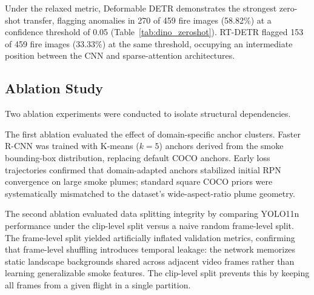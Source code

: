 \documentclass[conference]{IEEEtran}
\begin{document}

Under the relaxed metric, Deformable DETR demonstrates the strongest zero-shot transfer, flagging anomalies in 270 of 459 fire images (58.82\%) at a confidence threshold of 0.05 (Table~\ref{tab:dino_zeroshot}). RT-DETR flagged 153 of 459 fire images (33.33\%) at the same threshold, occupying an intermediate position between the CNN and sparse-attention architectures.

\FloatBarrier

\subsection{Ablation Study}
Two ablation experiments were conducted to isolate structural dependencies.

The first ablation evaluated the effect of domain-specific anchor clusters. Faster R-CNN was trained with K-means ($k=5$) anchors derived from the smoke bounding-box distribution, replacing default COCO anchors. Early loss trajectories confirmed that domain-adapted anchors stabilized initial RPN convergence on large smoke plumes; standard square COCO priors were systematically mismatched to the dataset's wide-aspect-ratio plume geometry.

The second ablation evaluated data splitting integrity by comparing YOLO11n performance under the clip-level split versus a naive random frame-level split. The frame-level split yielded artificially inflated validation metrics, confirming that frame-level shuffling introduces temporal leakage: the network memorizes static landscape backgrounds shared across adjacent video frames rather than learning generalizable smoke features. The clip-level split prevents this by keeping all frames from a given flight in a single partition.

\FloatBarrier
\end{document}
